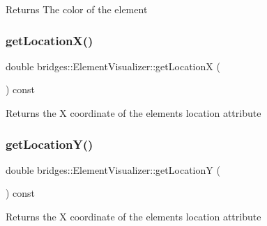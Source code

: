 \begin{DoxyReturn}{Returns}
The color of the element 
\end{DoxyReturn}
\hypertarget{classbridges_1_1_element_visualizer_ac944b8fb1b5b27454cf04145cb711ccc}{}\label{classbridges_1_1_element_visualizer_ac944b8fb1b5b27454cf04145cb711ccc} 
\subsubsection{\texorpdfstring{get\+Location\+X()}{getLocationX()}}
{\footnotesize\ttfamily double bridges\+::\+Element\+Visualizer\+::get\+LocationX (\begin{DoxyParamCaption}{ }\end{DoxyParamCaption}) const\hspace{0.3cm}{\ttfamily [inline]}}

\begin{DoxyReturn}{Returns}
the X coordinate of the element\textquotesingle{}s location attribute 
\end{DoxyReturn}
\hypertarget{classbridges_1_1_element_visualizer_a0c17d12888f98e710ed0d5ab6e142f8e}{}\label{classbridges_1_1_element_visualizer_a0c17d12888f98e710ed0d5ab6e142f8e} 
\subsubsection{\texorpdfstring{get\+Location\+Y()}{getLocationY()}}
{\footnotesize\ttfamily double bridges\+::\+Element\+Visualizer\+::get\+LocationY (\begin{DoxyParamCaption}{ }\end{DoxyParamCaption}) const\hspace{0.3cm}{\ttfamily [inline]}}

\begin{DoxyReturn}{Returns}
the X coordinate of the element\textquotesingle{}s location attribute 
\end{DoxyReturn}
\hypertarget{classbridges_1_1_element_visualizer_ae806977ebc8ff1c5bce81c90b31902b5}{}\label{classbridges_1_1_element_visualizer_ae806977ebc8ff1c5bce81c90b31902b5} 
